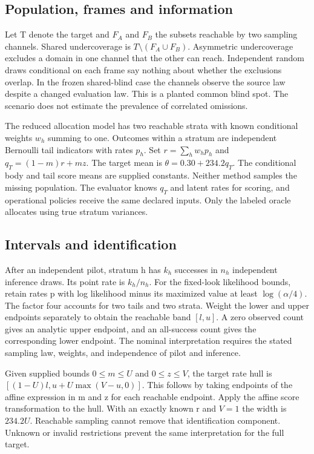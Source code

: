 \documentclass[article,nojss]{jss}
\begin{document}
\subsection{Population, frames and information}

Let T denote the target and \(F_A\) and \(F_B\) the subsets reachable by
two sampling channels. Shared undercoverage is \(T\setminus(F_A\cup
F_B)\). Asymmetric undercoverage excludes a domain in one channel that
the other can reach. Independent random draws conditional on each frame
say nothing about whether the exclusions overlap. In the frozen
shared-blind case the channels observe the source law despite a changed
evaluation law. This is a planted common blind spot. The scenario does
not estimate the prevalence of correlated omissions.

The reduced allocation model has two reachable strata with known
conditional weights \(w_h\) summing to one. Outcomes within a stratum
are independent Bernoulli tail indicators with rates \(p_h\). Set
\(r=\sum_h w_h p_h\) and \(q_T=(1-m)r+mz\). The target mean is
\(\theta=0.30+234.2q_T\). The conditional body and tail score means are
supplied constants. Neither method samples the missing population. The
evaluator knows \(q_T\) and latent rates for scoring, and operational
policies receive the same declared inputs. Only the labeled oracle
allocates using true stratum variances.

\subsection{Intervals and identification}

After an independent pilot, stratum h has \(k_h\) successes in \(n_h\)
independent inference draws. Its point rate is \(k_h/n_h\). For the
fixed-look likelihood bounds, retain rates p with log likelihood minus
its maximized value at least \(\log(\alpha/4)\). The factor four
accounts for two tails and two strata. Weight the lower and upper
endpoints separately to obtain the reachable band \([l,u]\). A zero
observed count gives an analytic upper endpoint, and an all-success
count gives the corresponding lower endpoint. The nominal interpretation
requires the stated sampling law, weights, and independence of pilot and
inference.

Given supplied bounds \(0\leq m\leq U\) and \(0\leq z\leq V\), the
target rate hull is \([(1-U)l,u+U\max(V-u,0)]\). This follows by taking
endpoints of the affine expression in m and z for each reachable
endpoint. Apply the affine score transformation to the hull. With an
exactly known r and \(V=1\) the width is \(234.2U\). Reachable sampling
cannot remove that identification component. Unknown or invalid
restrictions prevent the same interpretation for the full target.
\end{document}
